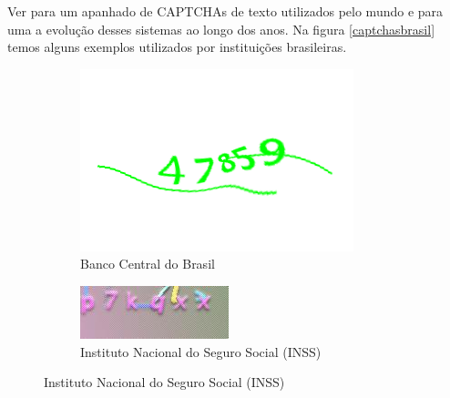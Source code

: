 Ver \cite{bursztein2011text} para um apanhado de CAPTCHAs de texto utilizados pelo mundo e \cite{captcha_review_2017} para uma a evolução desses sistemas ao longo dos anos. Na figura \ref{captchasbrasil} temos alguns exemplos utilizados por instituições brasileiras.

\begin{figure}[ht]
	\begin{subfigure}[t]{.475\textwidth}
		\centering
		\includegraphics[width=.9\linewidth, height=.4\linewidth]{figuras/captcha_banco_central.png}
		\caption{Banco Central do Brasil}
	\end{subfigure}
	\hspace{.05\textwidth}
	\begin{subfigure}[t]{.475\textwidth}
		\centering
		\includegraphics[width=.9\linewidth, height=.4\linewidth]{figuras/captcha_inss.jpeg}
		\caption{Instituto Nacional do Seguro Social (INSS)}
	\end{subfigure}%
	

\end{figure}
